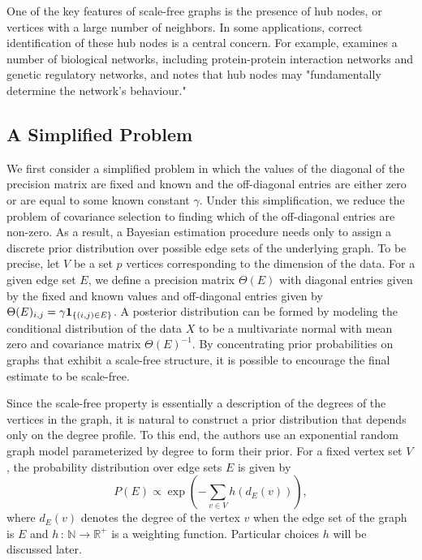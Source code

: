 \documentclass{uwstat572}
\theoremstyle{remark}
\theoremstyle{definition}
\begin{document}
One of the key features of scale-free graphs is the presence of hub nodes, or vertices with a large number of neighbors.  In some applications, correct identification of these hub nodes is a central concern.  For example, \cite{barabasi2004network} examines a number of biological networks, including protein-protein interaction networks and genetic regulatory networks, and notes that hub nodes may "fundamentally determine the network's behaviour."



\subsection{A Simplified Problem}

We first consider a simplified problem in which the values of the diagonal of the precision matrix are fixed and known and the off-diagonal entries are either zero or are equal to some known constant $\gamma$.  
Under this simplification, we reduce the problem of covariance selection to finding which of the off-diagonal entries are non-zero.  As a result, a Bayesian estimation procedure needs only to assign a discrete prior distribution over possible edge sets of the underlying graph. To be precise, let $V$ be a set $p$ vertices corresponding to the dimension of the data.  For a given edge set $E$, we define a precision matrix $\Theta(E)$ with diagonal entries given by the fixed and known values and off-diagonal entries given by $\Theta(E)_{i,j} = \gamma {\bf{1}}_{\{(i,j) \in E\}}$.
A posterior distribution can be formed by modeling the conditional distribution of the data $X$ to be a multivariate normal with mean zero and covariance matrix $\Theta(E)^{-1}$.  By concentrating prior probabilities on graphs that exhibit a scale-free structure, it is possible to encourage the final estimate to be scale-free.

Since the scale-free property is essentially a description of the degrees of the vertices in the graph, it is natural to construct a prior distribution that depends only on the degree profile.  To this end, the authors use an exponential random graph model parameterized by degree to form their prior.  For a fixed vertex set $V$, the probability distribution over edge sets $E$ is given by
\begin{equation}\label{cprior}
P( E ) \propto \exp \left( - \sum_{v \in V} h(d_E(v)) \right),
\end{equation}
where $d_E(v)$ denotes the degree of the vertex $v$ when the edge set of the graph is $E$ and $h \, : \, \mathbb{N} \to \mathbb{R}^+$ is a weighting function.  Particular choices $h$ will be discussed later.
\end{document}
